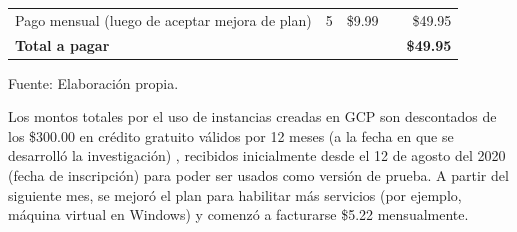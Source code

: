 \begin{table}[h!]
\begin{tabular}{lcrcr}
		Pago mensual (luego de aceptar mejora de plan) & 5 & \$9.99 & \multicolumn{1}{l}{} & \$49.95                                                                              \\
		\rowcolor[HTML]{303498} 
		{\color[HTML]{FFFFFF} \textbf{Total a pagar}} & {\color[HTML]{FFFFFF}} & \multicolumn{1}{l}{\cellcolor[HTML]{303498}{\color[HTML]{FFFFFF} }} & \multicolumn{1}{l}{\cellcolor[HTML]{303498}} & {\color[HTML]{FFFFFF} \textbf{\$49.95}}                                             
	\end{tabular}
	\par	%
	\bigskip
	\begin{flushleft}	%
		\small Fuente: Elaboración propia.
	\end{flushleft}
\end{table}

Los montos totales por el uso de instancias creadas en GCP son descontados de los \$300.00 en crédito gratuito válidos por 12 meses (a la fecha en que se desarrolló la investigación) \parencite{ot_googlecloud_freetrial}, recibidos inicialmente desde el 12 de agosto del 2020 (fecha de inscripción) para poder ser usados como versión de prueba. A partir del siguiente mes, se mejoró el plan para habilitar más servicios (por ejemplo, máquina virtual en Windows) y comenzó a facturarse \$5.22 mensualmente.
